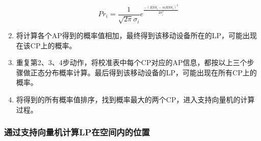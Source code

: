 \documentclass[UTF8, twocolumn ]{ctexart}
\begin{document}
\begin{enumerate}
  \begin{equation}
    Pr_{i}=\frac{1}{\sqrt{2\pi}\sigma_{i}}e^{\frac{-(RSS_{i}-mRSS_{i})^{2}}{2\sigma_{i}^{2}}}
  \end{equation}
\item 将计算各个AP得到的概率值相加，最终得到该移动设备所在的LP，可能出现在该CP上的概率。
\item 重复第2、3、4步动作，将校准表中每个CP对应的AP信息，都按以上三个步骤做正态分布概率计算。最后得到该移动设备的LP，可能出现在所有CP上的概率。
\item 将得到的所有概率值排序，找到概率最大的两个CP，进入支持向量机的计算过程。
\end{enumerate}

\subsubsection{通过支持向量机计算LP在空间内的位置}
\end{document}
